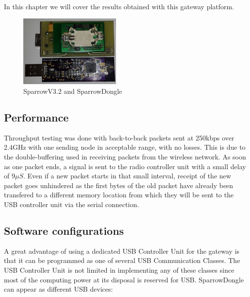\label{chap:results}

In this chapter we will cover the results obtained with this gateway platform.

\begin{figure}[ht] \centering
\includegraphics[width=0.45\textwidth]{img/sparrow.jpg} \caption{SparrowV3.2 and SparrowDongle} \end{figure}

 
\subsection{Performance}

Throughput testing was done with back-to-back packets sent at 250kbps over
2.4GHz with one sending node in acceptable range, with no losses. This is due
to the double-buffering used in receiving packets from the wireless network.
As soon as one packet ends, a signal is sent to the radio controller unit with
a small delay of 9$\mu S$. Even if a new packet starts in that small interval,
receipt of the new packet goes unhindered as the first bytes of the old packet
have already been transfered to a different memory location from which they
will be sent to the USB controller unit via the serial connection.

\subsection{Software configurations}

A great advantage of using a dedicated USB Controller Unit for the gateway is
that it can be programmed as one of several USB Communication Classes. The USB
Controller Unit is not limited in implementing any of these classes since most
of the computing power at its disposal is reserved for USB.  SparrowDongle can
appear as different USB devices:

